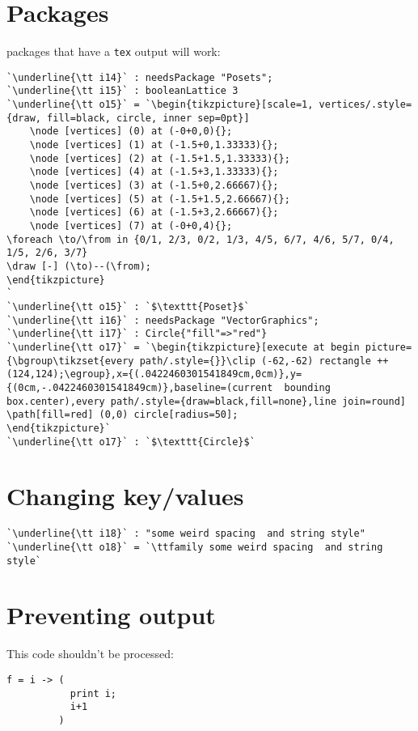 \documentclass[12pt,a4paper]{amsart}
\begin{document}
\section{Packages}
packages that have a {\tt tex} output will work:
\begin{lstlisting}[language=Macaulay2output]
`\underline{\tt i14}` : needsPackage "Posets";
`\underline{\tt i15}` : booleanLattice 3
`\underline{\tt o15}` = `\begin{tikzpicture}[scale=1, vertices/.style={draw, fill=black, circle, inner sep=0pt}]
	\node [vertices] (0) at (-0+0,0){};
	\node [vertices] (1) at (-1.5+0,1.33333){};
	\node [vertices] (2) at (-1.5+1.5,1.33333){};
	\node [vertices] (4) at (-1.5+3,1.33333){};
	\node [vertices] (3) at (-1.5+0,2.66667){};
	\node [vertices] (5) at (-1.5+1.5,2.66667){};
	\node [vertices] (6) at (-1.5+3,2.66667){};
	\node [vertices] (7) at (-0+0,4){};
\foreach \to/\from in {0/1, 2/3, 0/2, 1/3, 4/5, 6/7, 4/6, 5/7, 0/4, 1/5, 2/6, 3/7}
\draw [-] (\to)--(\from);
\end{tikzpicture}
`
`\underline{\tt o15}` : `$\texttt{Poset}$`
`\underline{\tt i16}` : needsPackage "VectorGraphics";
`\underline{\tt i17}` : Circle{"fill"=>"red"}
`\underline{\tt o17}` = `\begin{tikzpicture}[execute at begin picture={\bgroup\tikzset{every path/.style={}}\clip (-62,-62) rectangle ++(124,124);\egroup},x={(.0422460301541849cm,0cm)},y={(0cm,-.0422460301541849cm)},baseline=(current  bounding  box.center),every path/.style={draw=black,fill=none},line join=round]
\path[fill=red] (0,0) circle[radius=50];
\end{tikzpicture}`
`\underline{\tt o17}` : `$\texttt{Circle}$`
\end{lstlisting}

\section{Changing key/values}
\begin{lstlisting}[showstringspaces=true,language=Macaulay2output,basewidth={1.5ex}]
`\underline{\tt i18}` : "some weird spacing  and string style"
`\underline{\tt o18}` = `\ttfamily some weird spacing  and string style`
\end{lstlisting}

\section{Preventing output}
This code shouldn't be processed:
\begin{lstlisting}[language=Macaulay2noparse]
f = i -> (
           print i;
           i+1
         )
\end{lstlisting}
\end{document}

